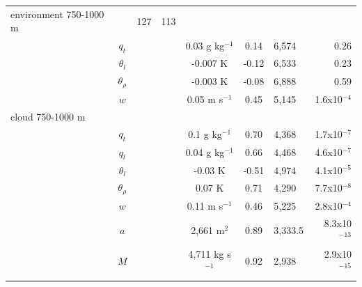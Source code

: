\documentclass[acp]{copernicus}
\begin{document}
\begin{table}[t]
\begin{tabular}{lccccclr}
environment 750-1000 m & & 127 & 113 & & & & \\
& $q_t$       & & &  0.03 g kg$^{-1}$          &  0.14 & 6,574 & 0.26    \\
& $\theta_l$ & & & -0.007 K                   & -0.12 & 6,533 & 0.23    \\
& $\theta_\rho$ & & & -0.003 K               & -0.08 & 6,888 & 0.59    \\
& $w$         & & &  0.05 m s$^{-1}$           &  0.45 & 5,145 & 1.6x10$^{-4}$ \\
cloud 750-1000 m & & & & & &          \\
& $q_t$       & & &  0.1 g kg$^{-1}$           &  0.70 & 4,368   & 1.7x10$^{-7}$ \\
& $q_l$       & & &  0.04 g kg$^{-1}$          &  0.66 & 4,468   & 4.6x10$^{-7}$ \\
& $\theta_l$ & & & -0.03 K                    & -0.51 & 4,974   & 4.1x10$^{-5}$  \\
& $\theta_\rho$ & & &  0.07 K                &  0.71 & 4,290   & 7.7x10$^{-8}$ \\
& $w$         & & &  0.11 m s$^{-1}$           &  0.46 & 5,225   & 2.8x10$^{-4}$  \\
& $a$         & & &  2,661 m$^2$                &  0.89 & 3,333.5 & 8.3x10$^{-13}$ \\
& $M$         & & &  4,711 kg s$^{-1}$    &  0.92 & 2,938 & 2.9x10$^{-15}$ \\

\bottomhline
\end{tabular}
\end{table}





\end{document}
